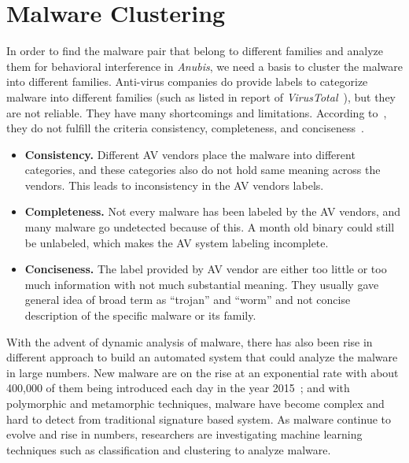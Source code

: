 \section{Malware Clustering}
\label{sec:Malware Clustering}
In order to find the malware pair that belong to different families and analyze them for behavioral interference in \emph{Anubis}, we need a basis to cluster the malware into different families.
Anti-virus companies do provide labels to categorize malware into different families (such as listed in report of \emph{VirusTotal}~\cite[]{virustotal}), but they are not reliable.
They have many shortcomings and limitations.
According to~\citeauthor{bailey}, they do not fulfill the criteria consistency, completeness, and conciseness~\cite[]{bailey}.\\
\begin{itemize}
\item \textbf{Consistency.} Different AV vendors place the malware into different categories, and these categories also do not hold same meaning across the vendors.
This leads to inconsistency in the AV vendors labels.
\item \textbf{Completeness.} Not every malware has been labeled by the AV vendors, and many malware go undetected because of this.
A month old binary could still be unlabeled, which makes the AV system labeling incomplete.
\item \textbf{Conciseness.} The label provided by AV vendor are either too little or too much information with not much substantial meaning.
They usually gave general idea of broad term as ``trojan'' and ``worm'' and not concise description of the specific malware or its family.
\end{itemize}
With the advent of dynamic analysis of malware, there has also been rise in different approach to build an automated system that could analyze the malware in large numbers.
New malware are on the rise at an exponential rate with about 400,000 of them being introduced each day in the year 2015~\cite[]{avtest}; and with polymorphic and metamorphic techniques, malware have become complex and hard to detect from traditional signature based system.
As malware continue to evolve and rise in numbers, researchers are investigating machine learning techniques such as classification and clustering to analyze malware.
